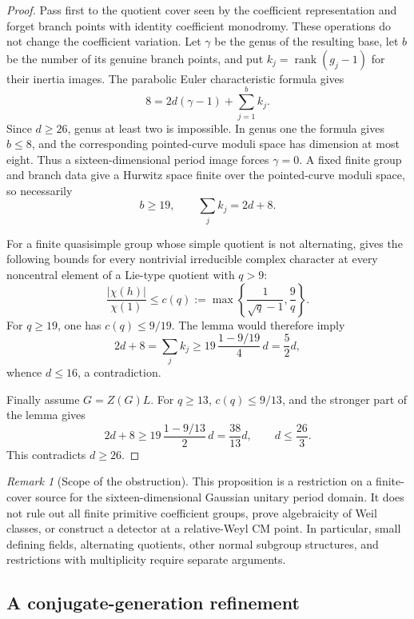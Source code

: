 \documentclass[11pt]{article}
\theoremstyle{definition}
\theoremstyle{remark}
\newtheorem{remark}[theorem]{Remark}
\begin{document}
\begin{proof}
Pass first to the quotient cover seen by the coefficient representation
and forget branch points with identity coefficient monodromy.  These
operations do not change the coefficient variation.  Let $\gamma$ be the
genus of the resulting base, let $b$ be the number of its genuine branch
points, and put $k_j=\operatorname{rank}(g_j-1)$ for their inertia images.
The parabolic Euler characteristic formula gives
\[
 8=2d(\gamma-1)+\sum_{j=1}^{b}k_j.
\]
Since $d\ge26$, genus at least two is impossible.  In genus one the formula
gives $b\le8$, and the corresponding pointed-curve moduli space has
dimension at most eight.  Thus a sixteen-dimensional period image forces
$\gamma=0$.  A fixed finite group and branch data give a Hurwitz space
finite over the pointed-curve moduli space, so necessarily
\[
 b\ge19,\qquad \sum_j k_j=2d+8.
\]

For a finite quasisimple group whose simple quotient is not alternating,
\cite[Theorem~4.1]{DuyanHalasiPodoskiRandomBases} gives the following bounds
for every nontrivial irreducible complex character at every noncentral
element of a Lie-type quotient with $q>9$:
\[
 \frac{|\chi(h)|}{\chi(1)}
 \le c(q):=\max\left\{\frac{1}{\sqrt q-1},\frac9q\right\}.
\]
For $q\ge19$, one has $c(q)\le9/19$.  The lemma would therefore imply
\[
 2d+8=\sum_j k_j\ge19\,\frac{1-9/19}{4}\,d
    =\frac52d,
\]
whence $d\le16$, a contradiction.

Finally assume $G=Z(G)L$.  For $q\ge13$, $c(q)\le9/13$, and the stronger
part of the lemma gives
\[
 2d+8\ge19\,\frac{1-9/13}{2}\,d=\frac{38}{13}d,
 \qquad d\le\frac{26}{3}.
\]
This contradicts $d\ge26$.
\end{proof}

\begin{remark}[Scope of the obstruction]
This proposition is a restriction on a finite-cover source for the
sixteen-dimensional Gaussian unitary period domain.  It does not rule out
all finite primitive coefficient groups, prove algebraicity of Weil
classes, or construct a detector at a relative-Weyl CM point.  In
particular, small defining fields, alternating quotients, other normal
subgroup structures, and restrictions with multiplicity require separate
arguments.
\end{remark}

\subsection{A conjugate-generation refinement}
\end{document}
